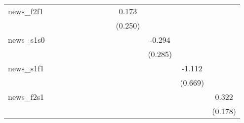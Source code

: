 {\begin{tabular}{l*{12}{c}}
\addlinespace
news\_f2f1   &                     &                     &                     &                     &                     &                     &                     &                     &       0.173         &                     &                     &                     \\
            &                     &                     &                     &                     &                     &                     &                     &                     &     (0.250)         &                     &                     &                     \\
\addlinespace
news\_s1s0   &                     &                     &                     &                     &                     &                     &                     &                     &                     &      -0.294         &                     &                     \\
            &                     &                     &                     &                     &                     &                     &                     &                     &                     &     (0.285)         &                     &                     \\
\addlinespace
news\_s1f1   &                     &                     &                     &                     &                     &                     &                     &                     &                     &                     &      -1.112\sym{*}  &                     \\
            &                     &                     &                     &                     &                     &                     &                     &                     &                     &                     &     (0.669)         &                     \\
\addlinespace
news\_f2s1   &                     &                     &                     &                     &                     &                     &                     &                     &                     &                     &                     &       0.322\sym{*}  \\
            &                     &                     &                     &                     &                     &                     &                     &                     &                     &                     &                     &     (0.178)         \\

\end{tabular}}
